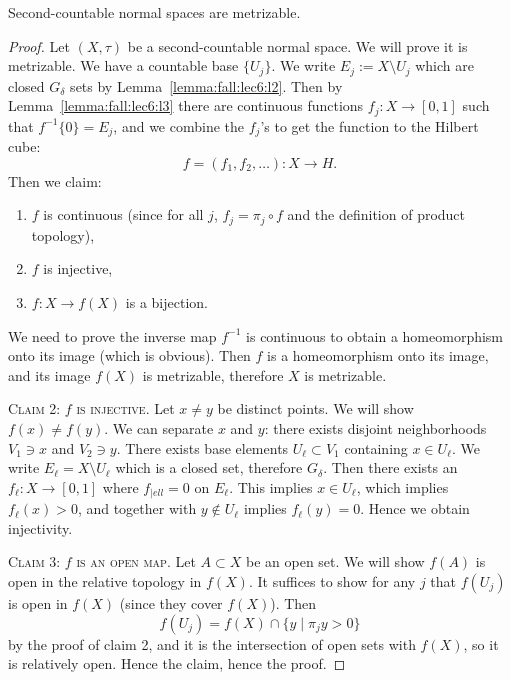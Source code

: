\begin{theorem}
Second-countable normal spaces are metrizable.
\end{theorem}

\begin{proof}
Let $(X,\tau)$ be a second-countable normal space. We will prove it is
metrizable. We have a countable base $\{U_{j}\}$. We write
$E_{j}:=X\setminus U_{j}$ which are closed $G_{\delta}$ sets by
Lemma~\ref{lemma:fall:lec6:l2}. Then by Lemma~\ref{lemma:fall:lec6:l3}
there are continuous functions $f_{j}\colon X\to[0,1]$ such that
$f^{-1}\{0\}=E_{j}$, and we combine the $f_{j}$'s to get the function
to the Hilbert cube:
\begin{equation}
f=(f_{1},f_{2},\dots)\colon X\to H.
\end{equation}
Then we claim:
\begin{enumerate}
\item $f$ is continuous (since for all $j$, $f_{j}=\pi_{j}\circ f$ and
  the definition of product topology),
\item $f$ is injective,
\item $f\colon X\to f(X)$ is a bijection.
\end{enumerate}
We need to prove the inverse map $f^{-1}$ is continuous to obtain a
homeomorphism onto its image (which is obvious). Then $f$ is a
homeomorphism onto its image, and its image $f(X)$ is metrizable,
therefore $X$ is metrizable.

\textsc{Claim 2: $f$ is injective}. Let $x\neq y$ be distinct
points. We will show $f(x)\neq f(y)$. We can separate $x$ and $y$:
there exists disjoint neighborhoods $V_{1}\ni x$ and $V_{2}\ni y$.
There exists base elements $U_{\ell}\subset V_{1}$ containing $x\in U_{\ell}$.
We write $E_{\ell}=X\setminus U_{\ell}$ which is a closed set,
therefore $G_{\delta}$. Then there exists an $f_{\ell}\colon X\to[0,1]$
where $f_{|ell}=0$ on $E_{\ell}$. This implies
$x\in U_{\ell}$, which implies $f_{\ell}(x)>0$, and together with
$y\notin U_{\ell}$ implies $f_{\ell}(y)=0$. Hence we obtain injectivity.

\textsc{Claim 3: $f$ is an open map}. Let $A\subset X$ be an open set.
We will show $f(A)$ is open in the relative topology in $f(X)$. It
suffices to show for any $j$ that $f(U_{j})$ is open in $f(X)$ (since
they cover $f(X)$). Then
\begin{equation}
f(U_{j})=f(X)\cap\{y\mid\pi_{j}y>0\}
\end{equation}
by the proof of claim 2, and it is the intersection of open sets with
$f(X)$, so it is relatively open. Hence the claim, hence the proof.
\end{proof}
